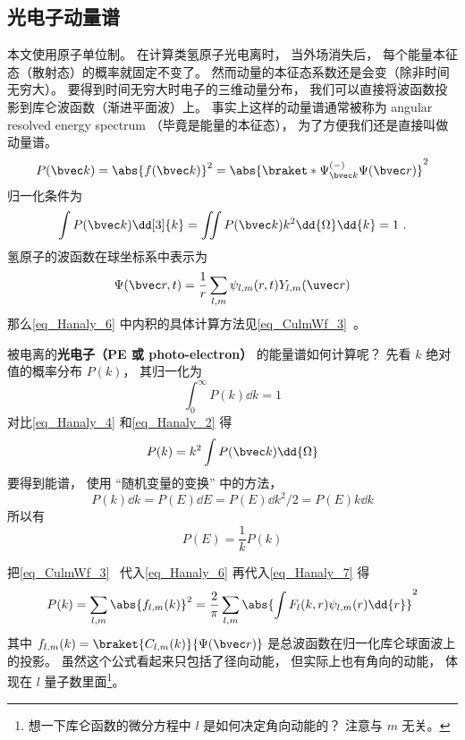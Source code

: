 

\subsection{光电子动量谱}

本文使用原子单位制。 在计算类氢原子光电离时， 当外场消失后， 每个能量本征态（散射态）的概率就固定不变了。 然而动量的本征态系数还是会变（除非时间无穷大）。 要得到时间无穷大时电子的三维动量分布， 我们可以直接将波函数投影到库仑波函数（渐进平面波）上。 事实上这样的动量谱通常被称为 angular resolved energy spectrum （毕竟是能量的本征态）， 为了方便我们还是直接叫做动量谱。
\begin{equation}\label{eq_Hanaly_6}
P(\bvec k) = \abs{f(\bvec k)}^2 = \abs{\braket*{\Psi^{(-)}_{\bvec k}}{\Psi(\bvec r)}}^2
\end{equation}
归一化条件为
\begin{equation}\label{eq_Hanaly_4}
\int P(\bvec k) \dd[3]{k} = \iint P(\bvec k) k^2\dd{\Omega}\dd{k} = 1~.
\end{equation}
氢原子的波函数在球坐标系中表示为
\begin{equation}
\Psi(\bvec r, t) = \frac{1}{r}\sum_{l,m} \psi_{l,m}(r, t) Y_{l,m}(\uvec r)
\end{equation}
那么\autoref{eq_Hanaly_6} 中内积的具体计算方法见\autoref{eq_CulmWf_3}~。

被电离的\textbf{光电子（PE 或 photo-electron）} 的能量谱如何计算呢？ 先看 $k$ 绝对值的概率分布 $P(k)$， 其归一化为
\begin{equation}\label{eq_Hanaly_2}
\int_0^\infty P(k) \dd{k} = 1
\end{equation}
对比\autoref{eq_Hanaly_4} 和\autoref{eq_Hanaly_2} 得
\begin{equation}\label{eq_Hanaly_7}
P(k) = k^2 \int P(\bvec k) \dd{\Omega}
\end{equation}
要得到能谱， 使用 “随机变量的变换” 中的方法，
\begin{equation}\label{eq_Hanaly_1}
P(k)\dd{k} = P(E)\dd{E} = P(E)\dd{k^2/2} = P(E)k\dd{k}
\end{equation}
所以有
\begin{equation}
P(E) = \frac{1}{k}P(k)
\end{equation}

把\autoref{eq_CulmWf_3}~ 代入\autoref{eq_Hanaly_6} 再代入\autoref{eq_Hanaly_7} 得
\begin{equation}
P(k) = \sum_{l,m} \abs{f_{l,m}(k)}^2 = \frac{2}{\pi} \sum_{l,m} \abs{\int F_l(k, r) \psi_{l,m}(r) \dd{r}}^2
\end{equation}
其中 $f_{l,m}(k) = \braket{C_{l,m}(k)}{\Psi(\bvec r)}$ 是总波函数在归一化库仑球面波上的投影。 虽然这个公式看起来只包括了径向动能， 但实际上也有角向的动能， 体现在 $l$ 量子数里面\footnote{想一下库仑函数的微分方程中 $l$ 是如何决定角向动能的？ 注意与 $m$ 无关。}。

